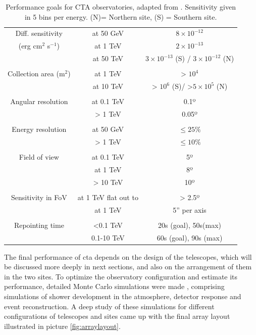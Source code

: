 \documentclass[main.tex]{subfiles}
\begin{document}
\begin{table}
  \centering
  \begin{tabular}{ccc}
    \hline
    Diff. sensitivity & at 50 GeV & $8\times10^{-12}$\\
    (erg cm$^2$ s$^{-1}$) & at 1 TeV & $2\times10^{-13}$\\
     & at 50 TeV & $3\times10^{-13}$ (S) / $3\times10^{-12}$ (N)\\\\
    Collection area (m$^{2}$) & at 1 TeV & > $10^4$ \\
    & at 10 TeV & > $10^6$ (S)/ >$5\times10^5$ (N) \\\\
    Angular resolution & at 0.1 TeV & 0.1º \\
    & > 1 TeV & 0.05º \\\\
    Energy resolution & at 50 GeV & $\le 25\%$ \\
    & > 1 TeV & $\le 10\%$ \\\\
    Field of view & at 0.1 TeV & 5º\\
    & at 1 TeV & 8º\\
    & > 10 TeV & 10º\\\\
    Sensitivity in FoV & at 1 TeV flat out to & > 2.5º \\
    & at 1 TeV & 5'' per axis \\\\
    Repointing time & <0.1 TeV  & 20s (goal), 50s(max) \\
    & 0.1-10 TeV & 60s (goal), 90s (max) \\
    \hline
  \end{tabular}
  \caption{Performance goals for CTA observatories, adapted from \cite{CTAconcept}. Sensitivity given in 5 bins per energy. (N)= Northern site, (S) = Southern site.}
  \label{tab:CTAgoals}
\end{table}

The final performance of \gls{cta} depends on the design of the telescopes, which will be discussed more deeply in next sections, and also on the arrangement of them in the two sites.
To optimize the observatory configuration and estimate its performance,  detailed Monte Carlo simulations were made \cite{2013CTAMonteCarlo}, comprising simulations of shower development in the atmosphere, detector response and event reconstruction.
A deep study of these simulations \cite{2017CTAMCPerformance} for different configurations of telescopes and sites came up with the final array layout illustrated in picture \ref{fig:arraylayout}.
\end{document}
